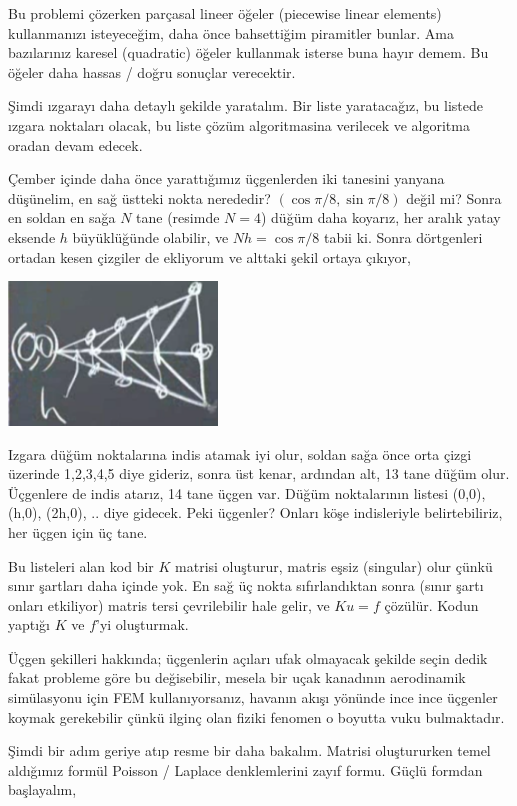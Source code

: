 \documentclass[12pt,fleqn]{article}\usepackage{../../common}
\begin{document}
Bu problemi çözerken parçasal lineer öğeler (piecewise linear elements)
kullanmanızı isteyeceğim, daha önce bahsettiğim piramitler bunlar. Ama
bazılarınız karesel (quadratic) öğeler kullanmak isterse buna hayır demem.
Bu öğeler daha hassas / doğru sonuçlar verecektir. 

Şimdi ızgarayı daha detaylı şekilde yaratalım. Bir liste yaratacağız, bu listede
ızgara noktaları olacak, bu liste çözüm algoritmasina verilecek ve algoritma
oradan devam edecek.

Çember içinde daha önce yarattığımız üçgenlerden iki tanesini yanyana düşünelim,
en sağ üstteki nokta nerededir? $(\cos \pi/8, \sin \pi/8)$ değil mi? Sonra en
soldan en sağa $N$ tane (resimde $N=4$) düğüm daha koyarız, her aralık yatay
eksende $h$ büyüklüğünde olabilir, ve $N h = \cos\pi/8$ tabii ki. Sonra
dörtgenleri ortadan kesen çizgiler de ekliyorum ve alttaki şekil ortaya çıkıyor,

\includegraphics[width=15em]{compscieng_1_27_03.png}

Izgara düğüm noktalarına indis atamak iyi olur, soldan sağa önce orta çizgi
üzerinde 1,2,3,4,5 diye gideriz, sonra üst kenar, ardından alt, 13 tane düğüm
olur. Üçgenlere de indis atarız, 14 tane üçgen var. Düğüm noktalarının listesi
(0,0), (h,0), (2h,0), .. diye gidecek. Peki üçgenler? Onları köşe indisleriyle
belirtebiliriz, her üçgen için üç tane.

Bu listeleri alan kod bir $K$ matrisi oluşturur, matris eşsiz (singular) olur
çünkü sınır şartları daha içinde yok. En sağ üç nokta sıfırlandıktan sonra
(sınır şartı onları etkiliyor) matris tersi çevrilebilir hale gelir, ve $Ku = f$
çözülür. Kodun yaptığı $K$ ve $f$'yi oluşturmak.

Üçgen şekilleri hakkında; üçgenlerin açıları ufak olmayacak şekilde seçin dedik
fakat probleme göre bu değisebilir, mesela bir uçak kanadının aerodinamik
simülasyonu için FEM kullanıyorsanız, havanın akışı yönünde ince ince üçgenler
koymak gerekebilir çünkü ilginç olan fiziki fenomen o boyutta vuku bulmaktadır.

Şimdi bir adım geriye atıp resme bir daha bakalım. Matrisi oluştururken temel
aldığımız formül Poisson / Laplace denklemlerini zayıf formu. Güçlü formdan
başlayalım,
\end{document}
